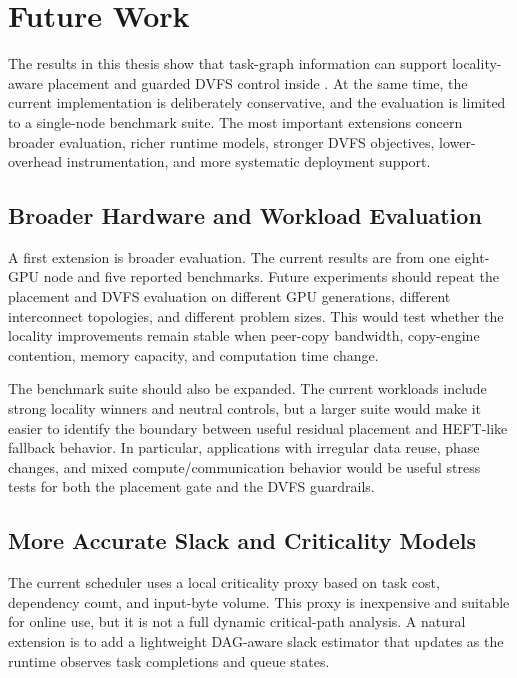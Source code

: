 \chapter{Future Work}
\label{chap:future-work}

The results in this thesis show that task-graph information can support
locality-aware placement and guarded DVFS control inside \CUDASTF{}. At the same
time, the current implementation is deliberately conservative, and the
evaluation is limited to a single-node benchmark suite. The most important
extensions concern broader evaluation, richer runtime models, stronger DVFS
objectives, lower-overhead instrumentation, and more systematic deployment
support.

\section{Broader Hardware and Workload Evaluation}
\label{sec:future-broader-evaluation}

A first extension is broader evaluation. The current results are from one
eight-GPU node and five reported benchmarks. Future experiments should repeat the
placement and DVFS evaluation on different GPU generations, different
interconnect topologies, and different problem sizes. This would test whether
the locality improvements remain stable when peer-copy bandwidth, copy-engine
contention, memory capacity, and computation time change.

The benchmark suite should also be expanded. The current workloads include
strong locality winners and neutral controls, but a larger suite would make it
easier to identify the boundary between useful residual placement and
HEFT-like fallback behavior. In particular, applications with irregular data
reuse, phase changes, and mixed compute/communication behavior would be useful
stress tests for both the placement gate and the DVFS guardrails.

\section{More Accurate Slack and Criticality Models}
\label{sec:future-slack-criticality}

The current scheduler uses a local criticality proxy based on task cost,
dependency count, and input-byte volume. This proxy is inexpensive and suitable
for online use, but it is not a full dynamic critical-path analysis. A natural
extension is to add a lightweight DAG-aware slack estimator that updates as the
runtime observes task completions and queue states.

